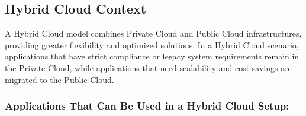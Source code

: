 \subsection{Hybrid Cloud Context}

A Hybrid Cloud model combines Private Cloud and Public Cloud infrastructures, providing greater flexibility and optimized solutions. In a Hybrid Cloud scenario, applications that have strict compliance or legacy system requirements remain in the Private Cloud, while applications that need scalability and cost savings are migrated to the Public Cloud.

\subsubsection{Applications That Can Be Used in a Hybrid Cloud Setup:}

